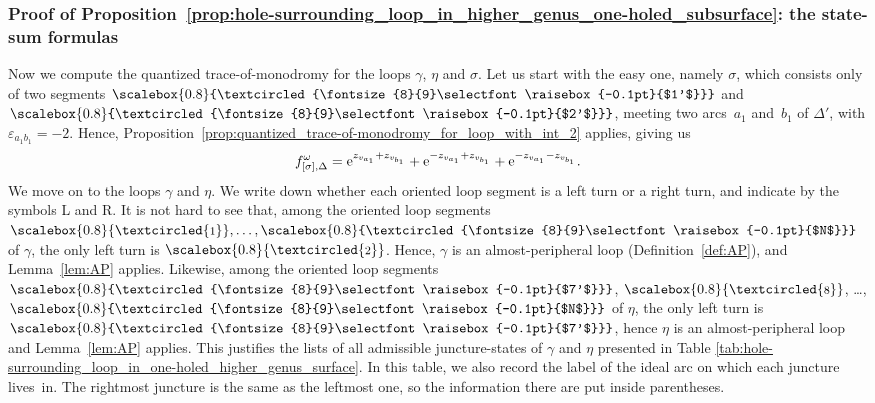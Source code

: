 \documentclass[pdftex]{sigma}
\numberwithin{equation}{section}
\theoremstyle{definition}
\newcommand{\circled}[1]{\scalebox{0.8}{\textcircled{\fontsize{8}{9}\selectfont \raisebox{-0.1pt}{#1}}}}
\begin{document}
\subsubsection{Proof of Proposition~\ref{prop:hole-surrounding_loop_in_higher_genus_one-holed_subsurface}: the state-sum formulas}
Now we compute the quantized trace-of-monodromy for the loops $\gamma$, $\eta$ and $\sigma$. Let us start with the easy one, namely $\sigma$, which consists only of two segments $\circled{$1'$}$ and $\circled{$2'$}$, meeting two arcs~$a_1$ and~$b_1$ of $\Delta'$, with $\varepsilon_{a_1b_1} = -2$. Hence, Proposition~\ref{prop:quantized_trace-of-monodromy_for_loop_with_int_2} applies, giving us\vspace{-1mm}
\begin{align}
\label{eq:ohs_proof_f_omega_sigma}
f^\omega_{[\sigma],\Delta} = {\rm e}^{z_{v_{a_1}} + z_{v_{b_1}}} + {\rm e}^{-z_{v_{a_1}} + z_{v_{b_1}}} + {\rm e}^{-z_{v_{a_1}}-z_{v_{b_1}}}.\vspace{-1mm}
\end{align}
We move on to the loops $\gamma$ and $\eta$. We write down whether each oriented loop segment is a left turn or a right turn, and indicate by the symbols L and R. It is not hard to see that, among the oriented loop segments $\circled{1},\dots,\circled{$N$}$ of $\gamma$, the only left turn is $\circled{2}$. Hence, $\gamma$ is an almost-peripheral loop (Definition~\ref{def:AP}), and Lemma~\ref{lem:AP} applies. Likewise, among the oriented loop segments $\circled{$7'$}$, $\circled{8}$, \dots, $\circled{$N$}$ of $\eta$, the only left turn is $\circled{$7'$}$, hence $\eta$ is an almost-peripheral loop and Lemma~\ref{lem:AP} applies. This justifies the lists of all admissible juncture-states of $\gamma$ and $\eta$ presented in Table \ref{tab:hole-surrounding_loop_in_one-holed_higher_genus_surface}. In this table, we also record the label of the ideal arc on which each juncture lives~in. The rightmost juncture is the same as the leftmost one, so the information there are put inside parentheses.
\end{document}
